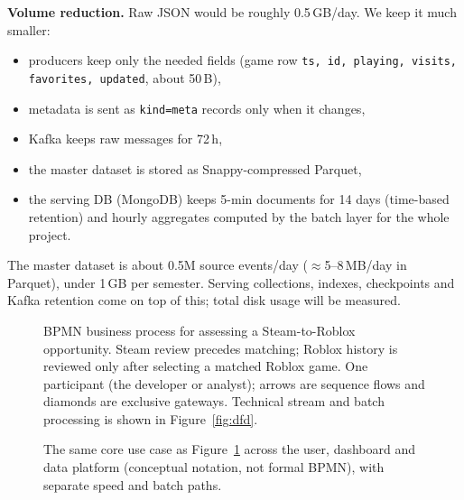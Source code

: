\documentclass[10pt,a4paper]{article}
\newcommand{\ep}[1]{\texttt{\small #1}}
\begin{document}
\textbf{Volume reduction.} Raw JSON would be roughly 0.5\,GB/day. We keep it much smaller:
\begin{itemize}
  \item producers keep only the needed fields (game row \ep{ts, id, playing, visits, favorites, updated}, about 50\,B),
  \item metadata is sent as \ep{kind=meta} records only when it changes,
  \item Kafka keeps raw messages for 72\,h,
  \item the master dataset is stored as Snappy-compressed Parquet,
  \item the serving DB (MongoDB) keeps 5-min documents for 14 days (time-based retention) and hourly aggregates computed by the batch layer for the whole project.
\end{itemize}
The master dataset is about 0.5M source events/day ($\approx$5--8\,MB/day in Parquet), under 1\,GB per semester. Serving collections, indexes, checkpoints and Kafka retention come on top of this; total disk usage will be measured.

\begin{landscape}
\begin{figure}[p]
\centering
\resizebox{\linewidth}{!}{}
\caption{BPMN business process for assessing a Steam-to-Roblox opportunity. Steam review precedes matching; Roblox history is reviewed only after selecting a matched Roblox game. One participant (the developer or analyst); arrows are sequence flows and diamonds are exclusive gateways. Technical stream and batch processing is shown in Figure~\ref{fig:dfd}.}
\label{fig:bpmn}
\end{figure}
\end{landscape}

\begin{landscape}
\begin{figure}[p]
\centering
\resizebox{\linewidth}{!}{}
\caption{The same core use case as Figure~\ref{fig:bpmn} across the user, dashboard and data platform (conceptual notation, not formal BPMN), with separate speed and batch paths.}
\label{fig:interaction-overview}
\end{figure}
\end{landscape}
\end{document}
